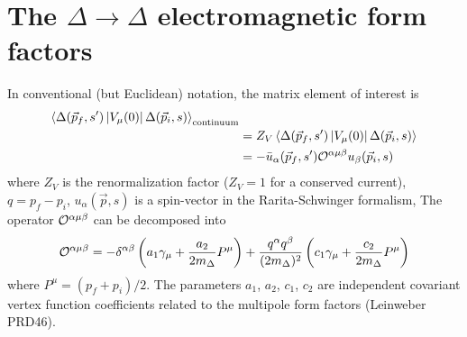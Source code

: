 \documentclass[12pt]{article}
\begin{document}
\section{The $\Delta\rightarrow \Delta$ electromagnetic form factors}

In conventional (but Euclidean) notation, the matrix element of interest is
\[
\begin{split}
\left<\Delta(\vec{p}_f,s^\prime)\left|V_\mu(0)\right|\Delta(\vec{p}_i,s)
     \right>_{\rm continuum} &\\
&= Z_V\left<\Delta(\vec{p}_f,s^\prime)\left|V_\mu(0)\right|\Delta(\vec{p}_i,s)\right> \\
&= -\bar{u}_\alpha(\vec{p}_f,s^\prime){\cal O}^{\alpha\mu\beta}u_\beta(\vec{p}_i,s)
\end{split}
\]
where $Z_V$ is the renormalization factor ($Z_V=1$ for a conserved current),
$q=p_f-p_i$, $u_\alpha(\vec{p},s)$ is a spin-vector in the Rarita-Schwinger formalism,
The operator ${\cal O}^{\alpha\mu\beta}$ can be 
decomposed into
\[
{\cal O}^{\alpha\mu\beta} = -\delta^{\alpha\beta}
  \left(a_1\gamma_\mu + \frac{a_2}{2 m_\Delta} P^\mu\right)
 +\frac{q^\alpha q^\beta}{(2 m_\Delta)^2} \left(c_1 \gamma_\mu 
      + \frac{c_2}{2 m_\Delta} P^\mu\right)
\]
where $P^\mu = (p_f + p_i)/2$.
The parameters $a_1$, $a_2$, $c_1$, $c_2$ are independent covariant
vertex function coefficients related to the multipole form factors
(Leinweber PRD46).
\end{document}
